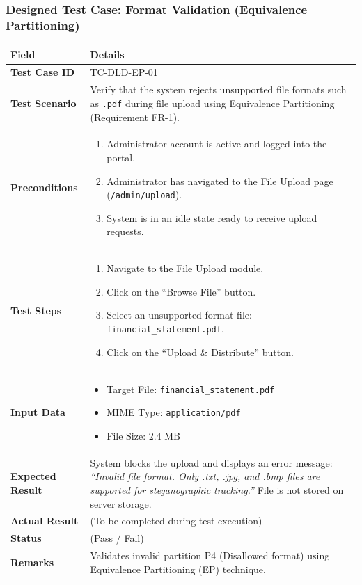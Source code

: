 \documentclass[11pt,a4paper]{article}
\begin{document}
\subsubsection*{Designed Test Case: Format Validation (Equivalence Partitioning)}
\noindent
\begin{tabularx}{\textwidth}{|>{\bfseries}p{3.5cm}|X|}
\hline
Field & Details \\
\hline
Test Case ID & TC-DLD-EP-01 \\
\hline
Test Scenario & Verify that the system rejects unsupported file formats such as \texttt{.pdf} during file upload using Equivalence Partitioning (Requirement FR-1). \\
\hline
Preconditions & 
\begin{enumerate}[leftmargin=*,nosep]
    \item Administrator account is active and logged into the portal.
    \item Administrator has navigated to the File Upload page (\texttt{/admin/upload}).
    \item System is in an idle state ready to receive upload requests.
\end{enumerate} \\
\hline
Test Steps & 
\begin{enumerate}[leftmargin=*,nosep]
    \item Navigate to the File Upload module.
    \item Click on the ``Browse File'' button.
    \item Select an unsupported format file: \texttt{financial\_statement.pdf}.
    \item Click on the ``Upload \& Distribute'' button.
\end{enumerate} \\
\hline
Input Data & 
\begin{itemize}[leftmargin=*,nosep]
    \item Target File: \texttt{financial\_statement.pdf}
    \item MIME Type: \texttt{application/pdf}
    \item File Size: $2.4\text{ MB}$
\end{itemize} \\
\hline
Expected Result & System blocks the upload and displays an error message: \textit{``Invalid file format. Only .txt, .jpg, and .bmp files are supported for steganographic tracking.''} File is not stored on server storage. \\
\hline
Actual Result & (To be completed during test execution) \\
\hline
Status & (Pass / Fail) \\
\hline
Remarks & Validates invalid partition P4 (Disallowed format) using Equivalence Partitioning (EP) technique. \\
\hline
\end{tabularx}
\end{document}
